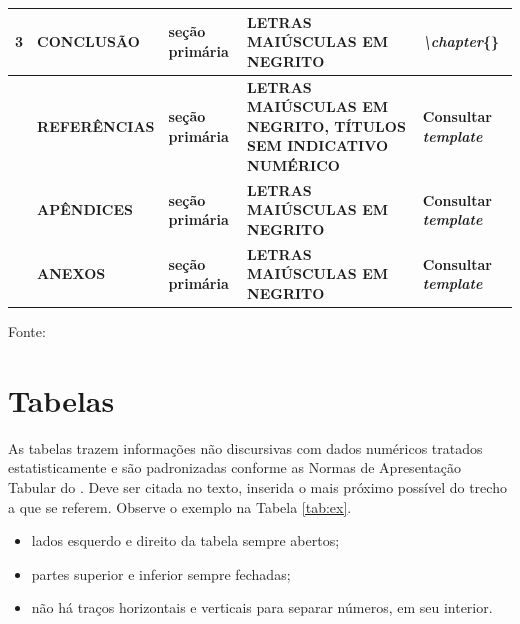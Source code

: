 \documentclass[
  12pt,		%
  a4paper,	%
  openright,  %
  oneside,	%
  chapter=TITLE,		%
  section=TITLE,		%
  english,	%
  french,	    %
  spanish,	%
  brazil	    %
]{abntex2}
\begin{document}
\begin{quadro}[H]
\begin{tabularx}{\columnwidth}{|X|X|X|X|X|}
            \textbf{3} & \textbf{CONCLUSÃO} & \textbf{seção primária} & \textbf{LETRAS MAIÚSCULAS EM NEGRITO} & \textit{\textbackslash chapter}\{\} \\ \hline

            & \textbf{REFERÊNCIAS} & \textbf{seção primária} & \textbf{LETRAS MAIÚSCULAS EM NEGRITO, TÍTULOS SEM INDICATIVO NUMÉRICO} & \textbf{Consultar \textit{template}} \\ \hline

            & \textbf{APÊNDICES} & \textbf{seção primária} & \textbf{LETRAS MAIÚSCULAS EM NEGRITO} & \textbf{Consultar \textit{template}} \\ \hline

            & \textbf{ANEXOS} & \textbf{seção primária} & \textbf{LETRAS MAIÚSCULAS EM NEGRITO} & \textbf{Consultar \textit{template}}\\ \hline
            
        \end{tabularx} \label{quadro:ex}
        {\small Fonte: }
        \end{quadro}
                                                         
                                 
             
    \section {Tabelas}
                 As tabelas trazem informações não discursivas com dados numéricos tratados estatisticamente e são padronizadas conforme as Normas de Apresentação Tabular do . Deve ser citada no texto, inserida o mais próximo possível do trecho a que se referem. Observe o exemplo na Tabela \ref{tab:ex}.
                \begin{itemize}
                    \item lados esquerdo e direito da tabela sempre abertos;
                    \item partes superior e inferior sempre fechadas;
                    \item não há traços horizontais e verticais para separar números, em seu interior.
                \end{itemize}
                
\end{document}

